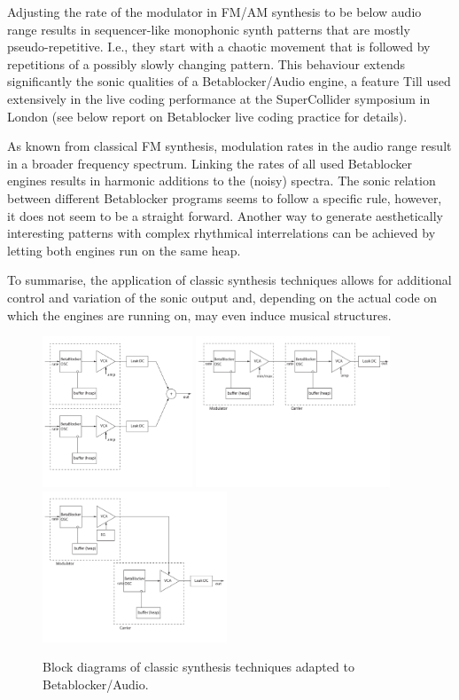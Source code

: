\documentclass[letterpaper, 12pt]{article}
\begin{document}
Adjusting the rate of the modulator in FM/AM synthesis to be below audio range results in sequencer-like monophonic synth patterns that are mostly pseudo-repetitive.
I.e., they start with a chaotic movement that is followed by repetitions of a possibly slowly changing pattern.
This behaviour extends significantly the sonic qualities of a Betablocker/Audio engine, a feature Till used extensively in the live coding performance at the SuperCollider symposium in London (see below report on Betablocker live coding practice for details).

As known from classical FM synthesis, modulation rates in the audio range result in a broader frequency spectrum.
Linking the rates of all used Betablocker engines results in harmonic additions to the (noisy) spectra.
The sonic relation between different Betablocker programs seems to follow a specific rule, however, it does not seem to be a straight forward.
Another way to generate aesthetically interesting patterns with complex rhythmical interrelations can be achieved by letting both engines run on the same heap.

To summarise, the application of classic synthesis techniques allows for additional control and variation of the sonic output and, depending on the actual code on which the engines are running on, may even induce musical structures.

\begin{figure}
	\centering
		\includegraphics[height=4.5cm]{Additive-Betablocker}
		\includegraphics[height=4.5cm]{FM-Betablocker}
		\includegraphics[height=4.5cm]{AM-Betablocker}
	\caption{Block diagrams of classic synthesis techniques adapted to Betablocker/Audio.}
	\label{fig:classicSynthesisTechniquesFMAMAdditive}
\end{figure}
\end{document}
